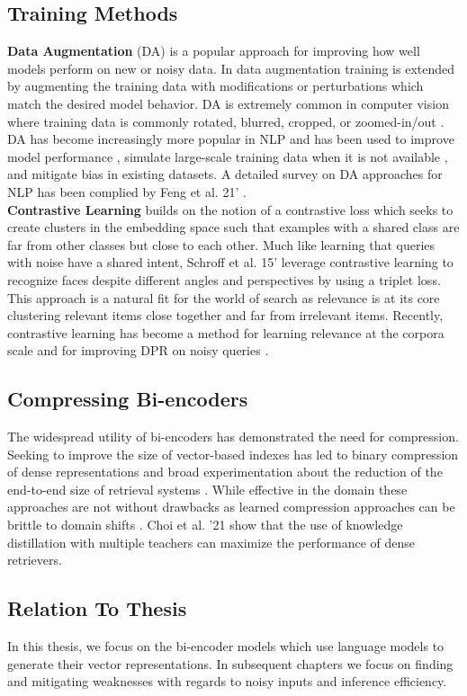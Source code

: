 \subsection{Training Methods}
\textbf{Data Augmentation} (DA) is a popular approach for improving how well models perform on new or noisy data. In data augmentation training is extended by augmenting the training data with modifications or perturbations which match the desired model behavior. DA is extremely common in computer vision where training data is commonly rotated, blurred, cropped, or zoomed-in/out \cite{Mikoajczyk2018DataAF} \cite{Zhong2020RandomED}. DA has become increasingly more popular in NLP and has been used to improve model performance \cite{Jiao2020TinyBERTDB}, simulate large-scale training data when it is not available \cite{Li2020ADD}, and mitigate bias \cite{Lu2020GenderBI} in existing datasets. A detailed survey on DA approaches for NLP has been complied by Feng et al. 21' \cite{Feng2021ASO}.\\
\textbf{Contrastive Learning} builds on the notion of a contrastive loss \cite{Chopra2005LearningAS} which seeks to create clusters in the embedding space such that examples with a shared class are far from other classes but close to each other. Much like learning that queries with noise have a shared intent, Schroff et al. 15' leverage contrastive learning to recognize faces despite different angles and perspectives \cite{Schroff2015FaceNetAU} by using a triplet loss. This approach is a natural fit for the world of search as relevance is at its core clustering relevant items close together and far from irrelevant items. Recently, contrastive learning has become a method for learning relevance at the corpora scale \cite{Xiong2021ApproximateNN} and for improving DPR on noisy queries \cite{Sidiropoulos2022AnalysingTR}.
\subsection{Compressing Bi-encoders}
The widespread utility of bi-encoders has demonstrated the need for compression. 
Seeking to improve the size of vector-based indexes has led to binary compression of dense representations \cite{Yamada2021EfficientPR} and broad experimentation about the reduction of the end-to-end size of retrieval systems \cite{Min2020NeurIPS2E}. While effective in the domain these approaches are not without drawbacks as learned compression approaches can be brittle to domain shifts \cite{Thakur2022DomainAF}. Choi et al. '21 \cite{Choi2021ImprovingBD} show that the use of knowledge distillation with multiple teachers can maximize the performance of dense retrievers. 
\subsection{Relation To Thesis}
In this thesis, we focus on the bi-encoder models which use language models to generate their vector representations. In subsequent chapters we focus on finding and mitigating weaknesses with regards to noisy inputs and inference efficiency. 

